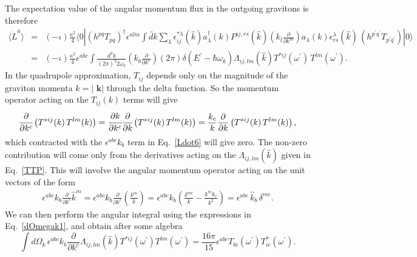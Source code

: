 \documentclass[aps,prd]{revtex4-2}
\begin{document}
\noindent The expectation value of the  angular momentum flux  in the outgoing gravitons is therefore 
\begin{eqnarray} \label{Ldot6}
\langle  \dot L^a \rangle &=&\left(-\iota\right) \frac{\kappa^2}{4} \langle 0| \left(h^{pq}T_{pq}\right)^\dagger \epsilon^{alm}
 \int \widetilde{dk} \sum_{\lambda} \epsilon^{*\lambda}_{ij}(\hat k) a_{\lambda} ^{\dagger}(k) P^{ij,rs}(\hat k) \left(k_{l} \frac{\partial}{\partial k^{m}}\right)a_{\lambda} (k)\epsilon^{\lambda}_{rs}(\hat k)\, 
 \left(h^{p^{\prime} q^{\prime}}T_{p^{\prime} q^{\prime}}\right)|0 \rangle\nonumber\\
 &=& \left(-\iota\right) \frac{\kappa^2}{4}\epsilon^{abc}\int \frac {d^3k}{(2\pi)^3 2{\omega}_k } \left(k_{b}\frac{\partial}{\partial k^{c}}  \right) \left(2\pi\right) \delta(E^{\prime}- \hbar {\omega}_{k})  {\Lambda_{ij,lm}(\hat k)}T^{*ij}(\omega^\prime)\,T^{lm}(\omega^\prime).
\end{eqnarray}
In the quadrupole approximation, $T_{ij}$ depends only on the magnitude of the graviton momenta $k=|\textbf{ k}|$ through the delta function. So the momentum operator acting on the $T_{ij}(k)$ terms will give
\begin{eqnarray}
    \cfrac{\partial}{\partial k^c} \left(T^{*ij}(k)\,T^{lm}(k)\right) = \cfrac{\partial k}{\partial k^c}\cfrac{\partial}{\partial k}  \left(T^{*ij}(k)\,T^{lm}(k)\right) = \frac{ k_c}{k}\frac{\partial}{\partial k}  \left(T^{*ij}(k)\,T^{lm}(k)\right), 
\end{eqnarray}
which contracted with the $\epsilon^{abc} k_b$ term in Eq.~\eqref{Ldot6} will give zero. The non-zero contribution will come only from the derivatives acting on the $\Lambda_{ij, lm}(\hat k)$ given in Eq.~\eqref{TTP}. This will involve the angular momentum operator acting on the unit vectors of the form
\begin{eqnarray}
    \epsilon^{abc}  k_{b}\frac{\partial}{\partial k^{c}}  \hat k^{m}=\epsilon^{abc} k_{b}\frac{\partial}{\partial k^{c}} \left(\frac{k^{m}}{k} \right)= \epsilon^{abc}  k_{b}\left(\frac{\delta^{mc}}{k} -\frac{k^m k_c} {k^2}\right) =\epsilon^{abc} \, \hat{k}_b\, \delta^{mc}.
\end{eqnarray}
We can then perform the angular integral using the expressions in Eq.~\eqref{dOmegak1}, and obtain after some algebra
\begin{equation}\label{domegaL-1}
\int d\Omega_k\, \epsilon^{abc}  k_{b}\frac{\partial}{\partial k^{c}} \Lambda_{ij,lm}(\hat k) T^{*ij}(\omega^\prime)T^{lm}({\omega^\prime})=\frac{16\pi}{15}\epsilon^{abc}  T_{bi}(\omega^\prime)T^*_{ic}(\omega^\prime).
\end{equation}
\end{document}
